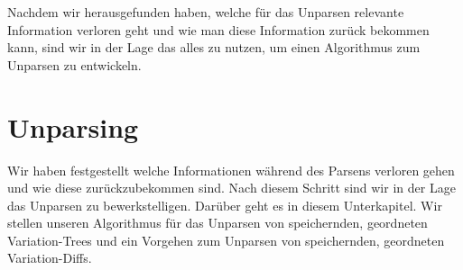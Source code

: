 Nachdem wir herausgefunden haben, welche für das Unparsen relevante Information verloren geht und wie man diese Information zurück bekommen kann, sind wir in der Lage das alles zu nutzen, um einen Algorithmus zum Unparsen zu entwickeln.


\section{Unparsing}



Wir haben festgestellt welche Informationen während des Parsens verloren gehen und wie diese zurückzubekommen sind. Nach diesem Schritt sind wir in der Lage das Unparsen zu bewerkstelligen. Darüber geht es in diesem Unterkapitel. Wir stellen unseren Algorithmus für das Unparsen von speichernden, geordneten Variation-Trees und ein Vorgehen zum Unparsen von speichernden, geordneten Variation-Diffs.\\


